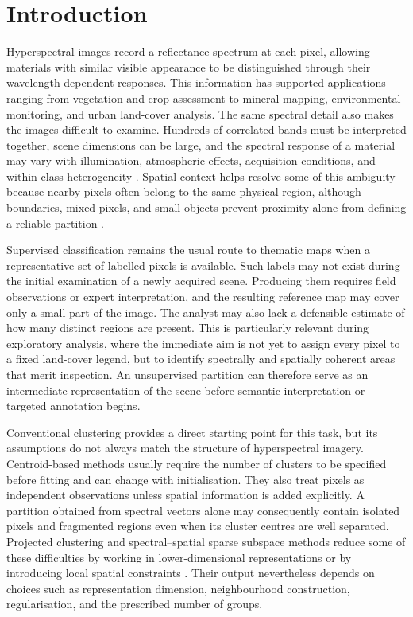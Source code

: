 \documentclass[10pt,a4paper,fleqn]{article}
\begin{document}
\section{Introduction}
\label{sec:introduction}

Hyperspectral images record a reflectance spectrum at each pixel, allowing
materials with similar visible appearance to be distinguished through their
wavelength-dependent responses. This information has supported applications
ranging from vegetation and crop assessment to mineral mapping, environmental
monitoring, and urban land-cover analysis. The same spectral detail also makes
the images difficult to examine. Hundreds of correlated bands must be interpreted
together, scene dimensions can be large, and the spectral response of a material
may vary with illumination, atmospheric effects, acquisition conditions, and
within-class heterogeneity \citep{bioucasdias2013}. Spatial context helps resolve
some of this ambiguity because nearby pixels often belong to the same physical
region, although boundaries, mixed pixels, and small objects prevent proximity
alone from defining a reliable partition \citep{he2018}.

Supervised classification remains the usual route to thematic maps when a
representative set of labelled pixels is available. Such labels may not exist
during the initial examination of a newly acquired scene. Producing them
requires field observations or expert interpretation, and the resulting
reference map may cover only a small part of the image. The analyst may also
lack a defensible estimate of how many distinct regions are present. This is
particularly relevant during exploratory analysis, where the immediate aim is
not yet to assign every pixel to a fixed land-cover legend, but to identify
spectrally and spatially coherent areas that merit inspection. An unsupervised
partition can therefore serve as an intermediate representation of the scene
before semantic interpretation or targeted annotation begins.

Conventional clustering provides a direct starting point for this task, but its
assumptions do not always match the structure of hyperspectral imagery.
Centroid-based methods usually require the number of clusters to be specified
before fitting and can change with initialisation. They also treat pixels as
independent observations unless spatial information is added explicitly.
A partition obtained from spectral vectors alone may consequently contain
isolated pixels and fragmented regions even when its cluster centres are
well separated. Projected clustering and spectral--spatial sparse subspace
methods reduce some of these difficulties by working in lower-dimensional
representations or by introducing local spatial constraints
\citep{mehta2016,zhang2016}. Their output nevertheless depends on choices such
as representation dimension, neighbourhood construction, regularisation, and
the prescribed number of groups.
\end{document}
